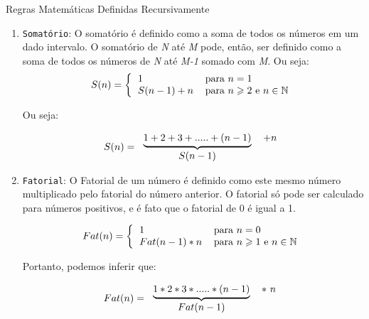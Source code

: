 \begin{frame}[c,allowframebreaks]{Regras Matemáticas Definidas Recursivamente}

        \begin{enumerate}
        
            \item \texttt{Somatório}: O somatório é definido como a soma de todos os números 
            em um dado intervalo. O somatório de \emph{N} até \emph{M} pode, então, ser 
            definido como a soma de todos os números de \emph{N} até \emph{M-1} somado com 
            \emph{M}. Ou seja:
            \[
            S(n)=\left \{
            \begin{tabular}
                [c]{ll}
                $1$ & para $n=1$ \\
                $S(n-1) + n $ & para $n \geqslant 2$ e $n \in \mathbb{N}$
            \end{tabular}
            \right.
            \]
            
            Ou seja:
            
            \[
            S(n)=
            \begin{tabular}[c]{cc}
                $\underbrace{1+2+3+.....+(n-1)}$ &  $  + n$\\
                $S(n-1)$ &
            \end{tabular}
            \]
            
            \framebreak
        
            \item \texttt{Fatorial}: O Fatorial de um número é definido como este mesmo número multiplicado pelo
            fatorial do número anterior. O fatorial só pode ser calculado para números positivos, e é fato que o fatorial
            de 0 é igual a 1.
              
            \[
            Fat(n)=\left\{
            \begin{tabular}[c]{ll}%
                $1$ & para $n = 0$\\
                $Fat(n-1)\ast n$ & para $n\geqslant1$ e $n \in \mathbb{N}$
            \end{tabular}
            \right.
            \]
            
            \vskip 11pt
            Portanto, podemos inferir que:
            \vskip 11pt
            
            \[
            Fat(n)=
            \begin{tabular}
                [c]{cc}%
                $\underbrace{1\ast2\ast3\ast.....\ast(n-1)}$ & $\ast \ n$\\
                $Fat(n-1)$ &
            \end{tabular}
            \]
    

\end{enumerate}
\end{frame}
